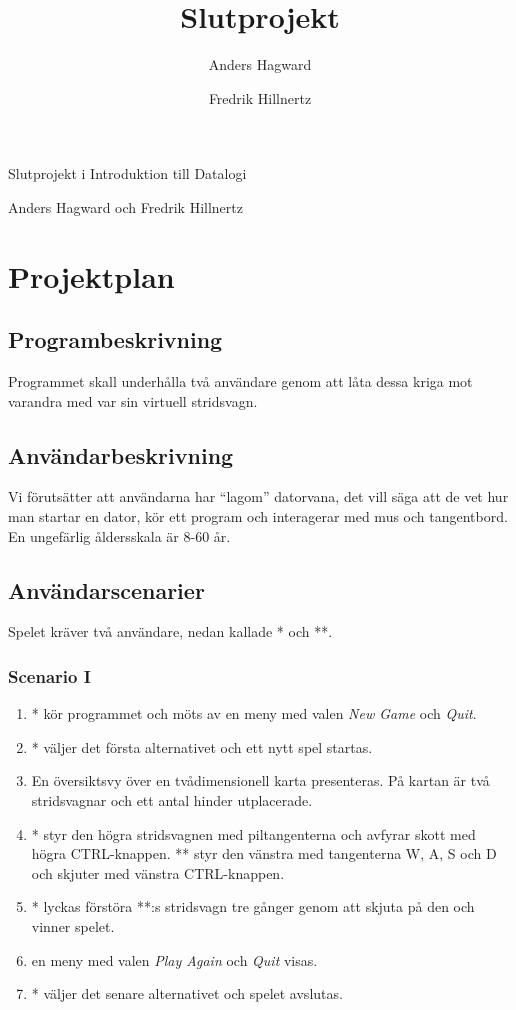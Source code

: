 \documentclass[11pt,a4paper]{article}
\author{Anders Hagward \and Fredrik Hillnertz}
\title{Slutprojekt}
\begin{document}
\thispagestyle{empty}
\begin{center}
\huge Slutprojekt i Introduktion till Datalogi

\normalsize Anders Hagward och Fredrik Hillnertz
\end{center}
\newpage

\tableofcontents
\newpage

\section{Projektplan}

\subsection{Programbeskrivning}
Programmet skall underhålla två användare genom att låta dessa kriga mot varandra med var sin virtuell stridsvagn.

\subsection{Användarbeskrivning}
Vi förutsätter att användarna har ``lagom'' datorvana, det vill säga att de vet hur man startar en dator, kör ett program och interagerar med mus och tangentbord. En ungefärlig åldersskala är 8-60 år.

\subsection{Användarscenarier}
Spelet kräver två användare, nedan kallade * och **.

\subsubsection{Scenario I}
\begin{enumerate}
	\item * kör programmet och möts av en meny med valen \emph{New Game} och \emph{Quit}.
	\item * väljer det första alternativet och ett nytt spel startas.
	\item En översiktsvy över en tvådimensionell karta presenteras. På kartan är två stridsvagnar och ett antal hinder utplacerade.
	\item * styr den högra stridsvagnen med piltangenterna och avfyrar skott med högra CTRL-knappen. ** styr den vänstra med tangenterna W, A, S och D och skjuter med vänstra CTRL-knappen.
	\item * lyckas förstöra **:s stridsvagn tre gånger genom att skjuta på den och vinner spelet.
	\item en meny med valen \emph{Play Again} och \emph{Quit} visas.
	\item * väljer det senare alternativet och spelet avslutas.
\end{enumerate}
\end{document}
